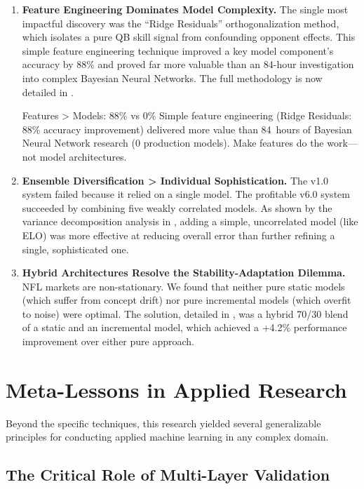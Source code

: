 \begin{enumerate}
    \item \textbf{Feature Engineering Dominates Model Complexity.} The single most impactful discovery was the ``Ridge Residuals'' orthogonalization method, which isolates a pure QB skill signal from confounding opponent effects. This simple feature engineering technique improved a key model component's accuracy by 88\% and proved far more valuable than an 84-hour investigation into complex Bayesian Neural Networks. The full methodology is now detailed in .

\begin{keyfinding}{Features > Models: 88\% vs 0\%}
Simple feature engineering (Ridge Residuals: 88\% accuracy improvement) delivered more value than 84~hours of Bayesian Neural Network research (0 production models). Make features do the work---not model architectures.
\end{keyfinding}

    \item \textbf{Ensemble Diversification > Individual Sophistication.} The v1.0 system failed because it relied on a single model. The profitable v6.0 system succeeded by combining five weakly correlated models. As shown by the variance decomposition analysis in , adding a simple, uncorrelated model (like ELO) was more effective at reducing overall error than further refining a single, sophisticated one.

    \item \textbf{Hybrid Architectures Resolve the Stability-Adaptation Dilemma.} NFL markets are non-stationary. We found that neither pure static models (which suffer from concept drift) nor pure incremental models (which overfit to noise) were optimal. The solution, detailed in , was a hybrid 70/30 blend of a static and an incremental model, which achieved a +4.2\% performance improvement over either pure approach.
\end{enumerate}

\section{Meta-Lessons in Applied Research}

Beyond the specific techniques, this research yielded several generalizable principles for conducting applied machine learning in any complex domain.

\subsection{The Critical Role of Multi-Layer Validation}

